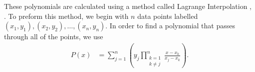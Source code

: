 \documentclass[12pt]{article}
\begin{document}
\begin{multicols*}{2}
    These polynomials are calculated using a method called Lagrange Interpolation \cite{enwiki:lagrange_polynomial}, \cite{mathworld:lagrange_polynomial}. To preform this method, we begin with $n$ data points labelled $(x_1, y_1), (x_2, y_2), \ldots, (x_n, y_n)$. In order to find a polynomial that passes through all of the points, we use
    \begin{align*}
        P(x) & = \sum_{j=1}^n\left(y_j\prod_{\substack{k=1 \\ k\neq j}}^n
        \frac{x-x_k}{x_j-x_k} \right).
    \end{align*}


    
    
\end{multicols*}
\end{document}
